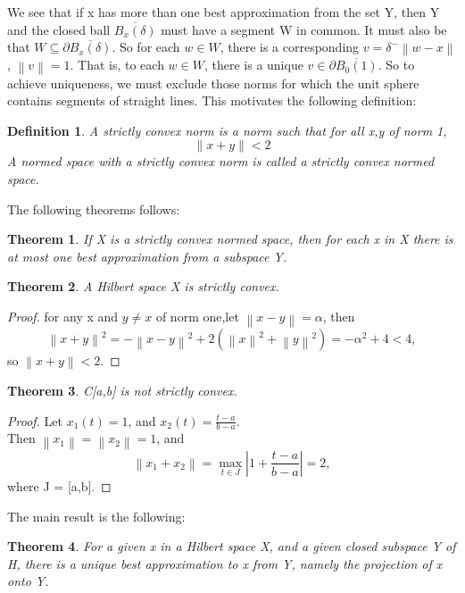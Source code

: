 \documentclass[12pt]{extarticle}
\newcommand{\norm}[1]{\left\lVert #1 \right\rVert}
\newtheorem{definition}{Definition}
\newtheorem{theorem}{Theorem}
\begin{document}
We see that if x has more than one best approximation from the set Y, then Y and the closed ball $\overline{B_x(\delta)}$ must have a segment W in common.
It must also be that $W\subseteq\partial\overline{B_x(\delta)}$. So for each $w\in W$, there is a corresponding $v = \delta^-\norm{w-x}$, $\norm{v} = 1$. That is, to each $w\in W$, there is a unique $v\in\partial\overline{B_0(1)}$. So to achieve uniqueness, we must exclude those norms for which the unit sphere contains segments of straight lines. This motivates the following definition:
\begin{definition}
	A strictly convex norm is a norm such that for all x,y of norm 1,
	\begin{equation}
		\norm{x+y} < 2
	\end{equation}
	A normed space with a strictly convex norm is called a strictly convex normed space.
\end{definition}
The following theorems follows:
\begin{theorem}
	If X is a strictly convex normed space, then for each x in X there is at most one best approximation from a subspace Y.
\end{theorem}
\begin{theorem}
	A Hilbert space X is strictly convex.
\end{theorem}
\begin{proof}
	for any x and $y\neq x$ of norm one,let $\norm{x-y} = \alpha$, then
	\begin{equation}
		\norm{x+y}^2 = -\norm{x-y}^2 + 2(\norm{x}^2 + \norm{y}^2) = -\alpha^2 + 4 < 4,
	\end{equation}
	so $\norm{x+y}<2$.
\end{proof}
\begin{theorem}
	C[a,b] is not strictly convex.
\end{theorem}
\begin{proof}
	Let $x_1(t) = 1$, and $x_2(t) = \frac{t-a}{b-a}$.\\
	Then $\norm{x_1} = \norm{x_2} = 1$, and 
	\begin{equation}
		\norm{x_1+x_2} = \max_{t\in J}\left\lvert 1+\frac{t-a}{b-a}\right\rvert = 2,
	\end{equation}
	where J = [a,b].
\end{proof}

The main result is the following:
\begin{theorem}
For a given x in a Hilbert space X, and a given closed subspace Y of H, there is a unique best approximation to x from Y, namely the projection of x onto Y.
\end{theorem}
\end{document}

